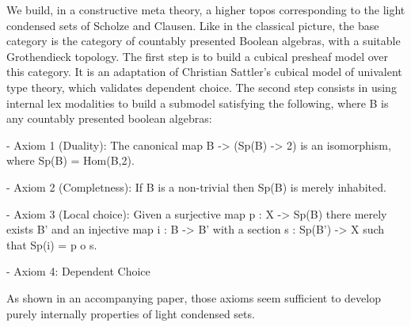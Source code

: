 We build, in a constructive meta theory, a higher topos corresponding to the light condensed sets of Scholze and Clausen.
Like in the classical picture, the base category is the category of countably presented Boolean algebras, with a suitable Grothendieck topology.
The first step is to build a cubical presheaf model over this category. It is an adaptation of Christian Sattler's cubical model of univalent type theory, which validates dependent choice. The second step consists in using internal lex modalities to build a submodel satisfying the following, where B is any countably presented boolean algebras:

- Axiom 1 (Duality): The canonical map B -> (Sp(B) -> 2) is an isomorphism, where Sp(B) = Hom(B,2).

- Axiom 2 (Completness): If B is a non-trivial then Sp(B) is merely inhabited.

- Axiom 3 (Local choice): Given a surjective map p : X -> Sp(B) there merely exists B' and an injective map
i : B -> B' with a section s : Sp(B') -> X such that Sp(i) = p o s.

- Axiom 4: Dependent Choice

As shown in an accompanying paper, those axioms seem sufficient to develop purely internally properties of light condensed sets.